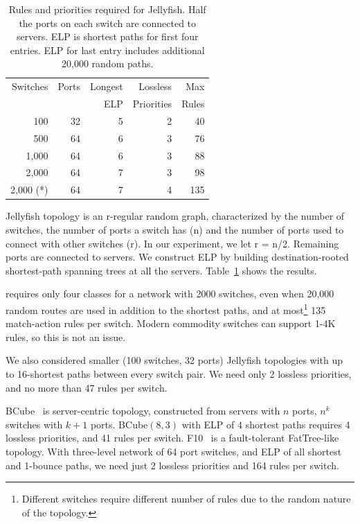 \begin{table}[t]
		\footnotesize
	\centering
		\begin{tabular}{|r|r|r|r|r|}
			\hline
				Switches & Ports & Longest & Lossless & Max \\
						 &		 & ELP & Priorities & Rules \\
			\hline
			\hline
			100 & 32 & 5 & 2 &  40 \\
			\hline
			500 & 64 & 6 & 3 & 76 \\
			\hline
			1,000 & 64 & 6 & 3 & 88 \\
			\hline
			2,000 & 64 & 7 & 3 & 98 \\
			\hline
			2,000 (*)  & 64 & 7 & 4 &  135\\
			\hline
			
		\end{tabular}
		\vspace{-1em}
		\caption{Rules and priorities required for Jellyfish. Half the ports on
		each switch are connected to servers. ELP is shortest paths for first four entries. ELP for last entry includes additional 20,000 random paths.}
		\vspace{-1em}
\label{table:jellyfish_shortestpath} \end{table}

Jellyfish topology is an r-regular random graph, characterized by the number of
switches, the number of ports a switch has (n) and the number of ports used to
connect with other switches (r).  In our experiment, we let r = n/2. Remaining
ports are connected to servers. We construct ELP by building destination-rooted
shortest-path spanning trees at all the servers.
Table~\ref{table:jellyfish_shortestpath} shows the results.

\sysname{} requires only four classes for a network with 2000 switches, even
when 20,000 random routes are used in addition to the shortest paths, and at
most\footnote{Different switches require different number of rules due to the
random nature of the topology.} 135 match-action rules per switch.  Modern
commodity switches can support 1-4K rules, so this is not an issue.

We also considered smaller (100 switches, 32 ports) Jellyfish
topologies with up to 16-shortest paths between every switch pair. 
We need only 2 lossless priorities, and no more than 47 rules per switch.

BCube~\cite{bcube} is server-centric topology, constructed from servers with $n$
ports, $n^k$ switches with $k+1$ ports. BCube$(8,3)$ with ELP of $4$ shortest
paths requires 4 lossless priorities, and 41 rules per switch.
F10~\cite{f10} is a fault-tolerant FatTree-like topology.  With three-level
network of 64 port switches, and ELP of all shortest and 1-bounce paths, we need
just 2 lossless priorities and 164 rules per switch.

